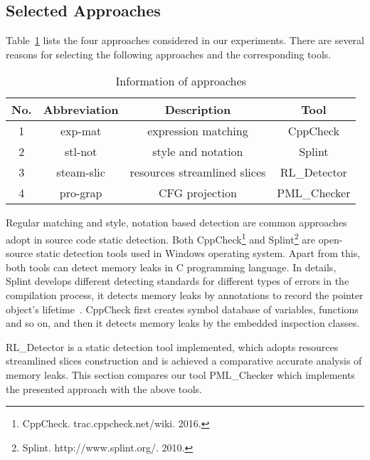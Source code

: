 \subsection{Selected Approaches}\label{ssec:ca}
Table~\ref{tab:2} lists the four approaches considered in our experiments. There are several reasons for selecting the following approaches and the corresponding tools. 
%
\begin{table}[!h]
\center
\caption{Information of approaches}\label{tab:2}
\begin{tabular}{|c|c|c|c|}
\hline
\textbf{No.} & \textbf{Abbreviation} & \textbf{Description} & \textbf{Tool}\\
\hline
1 & exp-mat & expression matching & CppCheck\\
\hline
2 & stl-not & style and notation &	Splint\\
\hline
3 & steam-slic & resources streamlined slices & RL\_Detector\\
\hline
4 & pro-grap &	CFG projection &	PML\_Checker\\
\hline
\end{tabular}
\end{table}
%
Regular matching and style, notation based detection are common approaches adopt in source code static detection. Both CppCheck\footnote{CppCheck. trac.cppcheck.net/wiki. 2016.} and Splint\footnote{Splint. http://www.splint.org/. 2010.} are open-source static detection tools used in Windows operating system. Apart from this, both tools can detect memory leaks in C programming language. In details, Splint develops different detecting standards for different types of errors in the compilation process, it detects memory leaks by annotations to record the pointer object’s lifetime~\cite{EL02}. CppCheck first creates symbol database of variables, functions and so on, and then it detects memory leaks by the embedded inspection classes.
 
RL\_Detector is a static detection tool implemented, which adopts resources streamlined slices construction and is achieved a comparative accurate analysis of memory leaks. This section compares our tool PML\_Checker which implements the presented approach with the above tools.


